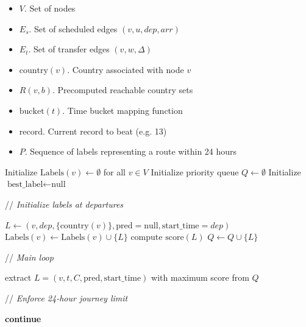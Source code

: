 \documentclass{article}
\newcommand{\CommentLine}[1]{
    \State // \textit{#1}
}
\begin{document}
\begin{algorithmic}[1] %
    
    \Input
    \begin{itemize}
        \item $V$. Set of nodes
        \item $E_s$. Set of scheduled edges $(v,u,dep,arr)$
        \item $E_t$. Set of transfer edges $(v,w,\Delta)$
        \item $\text{country}(v)$. Country associated with node $v$
        \item $R(v,b)$. Precomputed reachable country sets
        \item $\text{bucket}(t)$. Time bucket mapping function
        \item $\text{record}$. Current record to beat (e.g. 13)
    \end{itemize}

    \Output
    \begin{itemize}
        \item $P$. Sequence of labels representing a route within 24 hours
    \end{itemize}
    \vspace{0.5em} 

    \State Initialize $\text{Labels}(v) \leftarrow \emptyset$ for all $v \in V$
    \State Initialize priority queue $Q \leftarrow \emptyset$ 
    \State Initialize $\text{best\_label} \leftarrow \text{null}$

    \vspace{0.5em}
    \CommentLine{Initialize labels at departures}
            \State $L \leftarrow (v,dep,\{\text{country}(v)\},\text{pred}=\text{null},\text{start\_time}=dep)$
            \State $\text{Labels}(v) \leftarrow \text{Labels}(v) \cup \{L\}$
            \State compute $\text{score}(L)$ 
            \State $Q \leftarrow Q \cup \{L\}$
        \EndFor
    \EndFor

    \vspace{0.5em}
    \CommentLine{Main loop}
        \State extract $L=(v,t,C,\text{pred},\text{start\_time})$ with maximum score from $Q$

        \CommentLine{Enforce 24-hour journey limit}
            \State \textbf{continue}
        \EndIf


\end{algorithmic}
\end{document}
